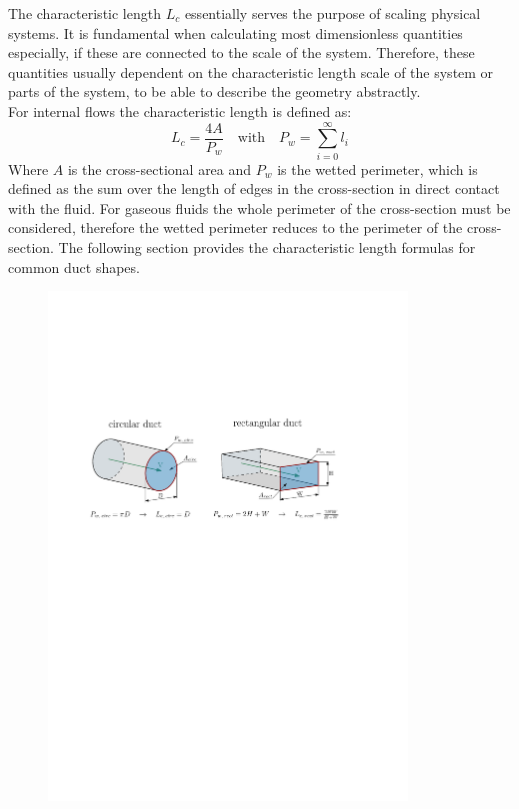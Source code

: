 The characteristic length $L_c$ essentially serves the purpose of scaling physical systems.
It is fundamental when calculating most dimensionless quantities especially, if these are connected to the scale of the system.
Therefore, these quantities usually dependent on the characteristic length scale of the system or parts of the system, to be able to describe the geometry abstractly.\\
For internal flows the characteristic length is defined as:
\begin{equation}
	L_c=\frac{4A}{P_w} \quad \text{with} \quad P_w = \sum^{\infty}_{i=0} l_i
\end{equation}
Where $A$ is the cross-sectional area and $P_w$ is the wetted perimeter, which is defined as the sum over the length of edges in the cross-section in direct contact with the fluid.
For gaseous fluids the whole perimeter of the cross-section must be considered, therefore the wetted perimeter reduces to the perimeter of the cross-section.
The following section provides the characteristic length formulas for common duct shapes.
\cite{leishman_internal_2023}
\begin{figure}[H]
    \centering
    \includegraphics[width=0.85\textwidth]{src/02_foundations/fig_wetted-perimeter-nozzle-rect.pdf}
    \label{fig:wetted-rect-nozzle}
\end{figure}
